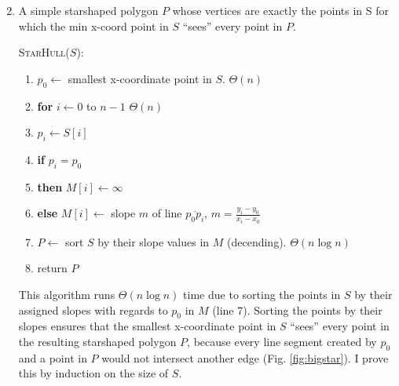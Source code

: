 \documentclass [12pt]{article}
\begin{document}
        \begin{enumerate}[label=(\alph*)]
            \setcounter{enumi}{1}

        \item A simple starshaped polygon $P$ whose vertices are exactly the points in S for which the min x-coord point in $S$ ``sees'' every point in $P$.
        
            \cbstart
            \textsc{StarHull($S$)}:
            \begin{enumerate}[label=\arabic*.]
                \item $p_0 \leftarrow $ smallest x-coordinate point in $S$. \hspace{1cm}$\Theta(n)$
                \item \textbf{for} $i \leftarrow 0$ to $n-1$    \hspace{1cm}$\Theta(n)$
                \item \hspace{1cm} $p_i \leftarrow S[i]$
                \item \hspace{1cm} \textbf{if} $p_i = p_0$ 
                \item \hspace{1.5cm} \textbf{then} $M[i] \leftarrow \infty$
                \item \hspace{1.5cm} \textbf{else} $M[i] \leftarrow$ slope $m$ of line $\overline{p_0 p_i}$, \hspace{1cm} $m = \frac{y_i - y_0}{x_i - x_0}$
                \item $P \leftarrow $ sort $S$ by their slope values in $M$ (decending). \hspace{1cm} $\Theta(n \log n)$
                \item return $P$ 
            \end{enumerate}
        \cbend

        This algorithm runs $\Theta(n \log n)$ time due to sorting the points in $S$ by their assigned slopes with regards to $p_0$ in $M$ (line 7). Sorting the points by their slopes ensures that the smallest x-coordinate point in $S$ ``sees'' every point in the resulting starshaped polygon $P$, because every line segment created by $p_0$ and a point in $P$ would not intersect another edge (Fig. \ref{fig:bigstar}). I prove this by induction on the size of $S$.



\end{enumerate}
\end{document}

